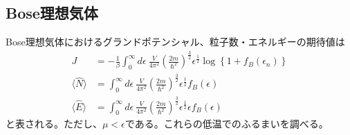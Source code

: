 \documentclass[dvipdfmx, 11pt, a4paper]{jsarticle}
\theoremstyle{definition}
\begin{document}
\subsection{Bose理想気体}
    Bose理想気体におけるグランドポテンシャル、粒子数・エネルギーの期待値は
    \begin{align}
        J &= -\frac{1}{\beta} \int_{0}^{\infty} d\epsilon\ \frac{V}{4 \pi^2} \left( \frac{2m}{\hbar^2} \right)^{\frac{3}{2}} \epsilon^\frac{1}{2} \log \left\{ 1 + f_B (\epsilon_n) \right\} \\
        \langle \hat{N} \rangle &= \int_0^{\infty} d\epsilon\ \frac{V}{4 \pi^2} \left( \frac{2m}{\hbar^2} \right)^{\frac{3}{2}} \epsilon^\frac{1}{2} f_B(\epsilon) \\
        \langle \hat{E} \rangle &= \int_0^{\infty} d\epsilon\  \frac{V}{4 \pi^2} \left( \frac{2m}{\hbar^2} \right)^{\frac{3}{2}} \epsilon^\frac{1}{2} \epsilon f_B(\epsilon)
    \end{align}
    と表される。ただし、$\mu < \epsilon$である。これらの低温でのふるまいを調べる。
\end{document}
